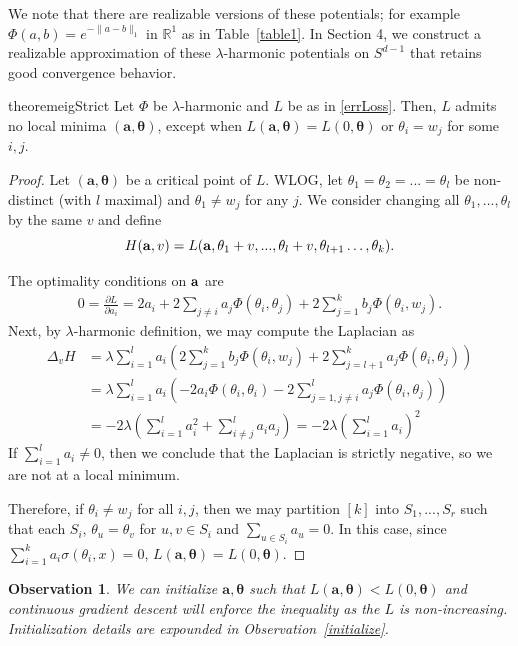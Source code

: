 \documentclass{article}
\newtheorem{observation}[theorem]{Observation}
\newcommand{\R}{{\mathbb{R}}}
\newcommand{\pd}[2]{\frac{\partial#1}{\partial#2}}
\begin{document}
We note that there are realizable versions of these potentials; for
example $\Phi(a,b) = e^{-\|a-b\|_1}$ in $\R^1$ as in Table~\ref{table1}. In Section 4, we construct a realizable approximation of these $\lambda$-harmonic potentials on $S^{d-1}$ that retains good convergence behavior.
%
\begin{restatable}{theorem}{eigStrict}
\label{EigStrict}
Let $\Phi$ be $\lambda$-harmonic and $L$ be as in \ref{errLoss}. Then,
$L$ admits no local minima $\boldsymbol{(a,\theta)}$, except when
$L(\boldsymbol{a,\theta}) = L(0,\boldsymbol{\theta})$ or $\theta_i = w_j$ for some $i,j$. 
\end{restatable}
\begin{proof}
  Let $(\boldsymbol{a,\theta})$ be a critical point of $L$. WLOG, let $\theta_1 = \theta_2 =... = \theta_l$ be non-distinct (with $l$ maximal) and $\theta_1 \neq w_j$ for any $j$. We consider changing all
$\theta_1, \ldots, \theta_{l}$ by the same $v$ and define 
%
\[H({\bf a}, v) = L({\bf a},\theta_1+v,...,\theta_l+v, \theta_{l+1}
\ldots, \theta_k).\]

The optimality conditions on ${\bf a}$ are 
\begin{align*}
0 = \pd{L}{a_i} = 2a_i  + 2\sum_{j\neq i} a_j \Phi(\theta_i,\theta_j)
  + 2\sum_{j=1}^k b_j \Phi(\theta_i,w_j).
\end{align*}
%
Next, by $\lambda$-harmonic definition, we may compute the Laplacian as 
\begin{align*}
\Delta_v H & = \lambda\sum_{i=1}^l a_i \left(2\sum_{j=1}^k b_j
  \Phi(\theta_i, w_j) + 2\sum_{j=l+1}^k a_j
  \Phi(\theta_i, \theta_j)\right) \\
& = \lambda\sum_{i=1}^l a_i \left(-2a_i\Phi(\theta_i, \theta_i) - 2
  \sum_{j = 1, j\neq i}^l  a_j \Phi(\theta_i,\theta_j)\right) \\
%
%
& = -2\lambda\left(\sum_{i=1}^l a_i^2
  +\sum_{i \neq j}^l a_i a_j \right) = -2 \lambda\left(\sum_{i=1}^l a_i\right)^2
\end{align*} 
%
If $\sum_{i=1}^l a_i \neq 0$, then we conclude that the Laplacian is
strictly negative, so we are not at a local minimum. 

Therefore, if $\theta_i \neq w_j$ for all $i,j$, then we may partition $[k]$ into $S_1,...,S_r$ such that each $S_i$, $\theta_{u} = \theta_v$
for $u, v \in S_i$ and $\sum_{u \in S_i} a_u = 0$. In this case, since $\sum_{i=1}^k a_i \sigma(\theta_i,x) = 0$, $L(\boldsymbol{a,\theta}) = L(0,\boldsymbol{\theta})$. 
\end{proof} 
%
\begin{observation}
We can initialize $\boldsymbol{a,\theta}$ such that $L(\boldsymbol{a,\theta}) < L(0,\boldsymbol{\theta})$ and continuous gradient descent will enforce the inequality as the $L$ is non-increasing. Initialization details are expounded in Observation~\ref{initialize}.
\end{observation}
%
\end{document}
